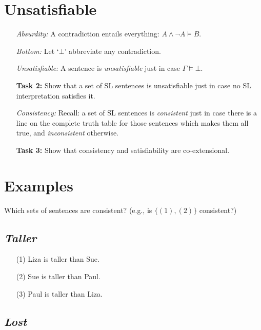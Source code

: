 \documentclass[a4paper, 11pt]{article} %
\newcommand{\set}[1]{\lbrace#1\rbrace} %
\begin{document}
\section*{Unsatisfiable}

\begin{enumerate}[leftmargin=1.2in,labelsep=.15in] %
  \item[\it Absurdity:] A contradiction entails everything: $A \wedge \neg A \vDash B$. 
  \item[\it Bottom:] Let `$\bot$' abbreviate any contradiction.
  \item[\it Unsatisfiable:] A sentence is \textit{unsatisfiable} just in case $\Gamma \vDash \bot$.
  \item[\bf Task 2:] Show that a set of SL sentences is unsatisfiable just in case no SL interpretation satisfies it.
  \item[\it Consistency:] Recall: a set of SL sentences is \textit{consistent} just in case there is a line on the complete truth table for those sentences which makes them all true, and \textit{inconsistent} otherwise.
  \item[\bf Task 3:] Show that consistency and satisfiability are co-extensional.
\end{enumerate}



\section*{Examples}

\noindent
Which sets of sentences are consistent? (e.g., is $\set{(1),(2)}$ consistent?)

\subsection*{\it \textbf{Taller}}

\begin{enumerate}
  \item[(1)] Liza is taller than Sue.
  \item[(2)] Sue is taller than Paul.
  \item[(3)] Paul is taller than Liza.
\end{enumerate}




\subsection*{\it \textbf{Lost}}
\end{document}
